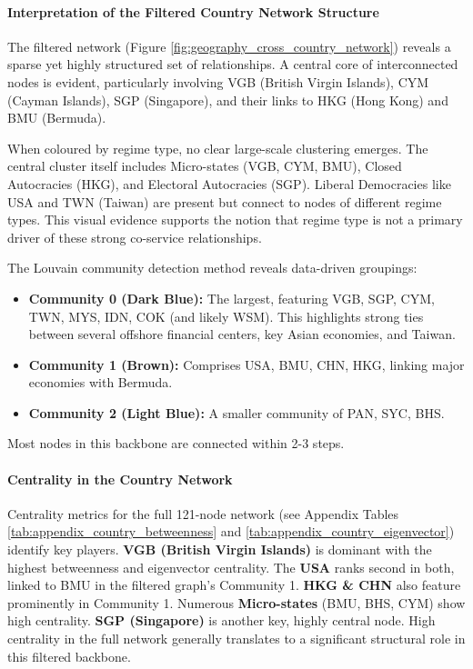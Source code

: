 \paragraph{Interpretation of the Filtered Country Network Structure}
The filtered network (Figure \ref{fig:geography_cross_country_network}) reveals a sparse yet highly structured set of relationships. A central core of interconnected nodes is evident, particularly involving VGB (British Virgin Islands), CYM (Cayman Islands), SGP (Singapore), and their links to HKG (Hong Kong) and BMU (Bermuda).

When coloured by regime type, no clear large-scale clustering emerges. The central cluster itself includes Micro-states (VGB, CYM, BMU), Closed Autocracies (HKG), and Electoral Autocracies (SGP). Liberal Democracies like USA and TWN (Taiwan) are present but connect to nodes of different regime types. This visual evidence supports the notion that regime type is not a primary driver of these strong co-service relationships.

The Louvain community detection method reveals data-driven groupings:
\begin{itemize}
    \item \textbf{Community 0 (Dark Blue):} The largest, featuring VGB, SGP, CYM, TWN, MYS, IDN, COK (and likely WSM). This highlights strong ties between several offshore financial centers, key Asian economies, and Taiwan.
    \item \textbf{Community 1 (Brown):} Comprises USA, BMU, CHN, HKG, linking major economies with Bermuda.
    \item \textbf{Community 2 (Light Blue):} A smaller community of PAN, SYC, BHS.
\end{itemize}
Most nodes in this backbone are connected within 2-3 steps.

\paragraph{Centrality in the Country Network}
Centrality metrics for the full 121-node network (see Appendix Tables \ref{tab:appendix_country_betweenness} and \ref{tab:appendix_country_eigenvector}) identify key players.
\textbf{VGB (British Virgin Islands)} is dominant with the highest betweenness and eigenvector centrality. The \textbf{USA} ranks second in both, linked to BMU in the filtered graph's Community 1. \textbf{HKG \& CHN} also feature prominently in Community 1. Numerous \textbf{Micro-states} (BMU, BHS, CYM) show high centrality. \textbf{SGP (Singapore)} is another key, highly central node. High centrality in the full network generally translates to a significant structural role in this filtered backbone.

